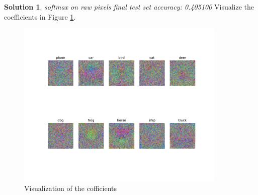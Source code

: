 \documentclass[]{book}
\theoremstyle{definition}
\newtheorem*{soln}{Solution}
\begin{document}
\begin{enumerate}
\begin{soln}
	\textsl{softmax on raw pixels final test set accuracy: 0.405100 }
	Visualize the coefficients in Figure \ref{fig:cofficient}.  
	\begin{figure}[H]
		\centering
		\includegraphics[width=10cm]{cofficients.pdf}
		\caption{Visualization of the cofficients}
		\label{fig:cofficient}
	\end{figure}

\end{soln}

\end{enumerate}
\end{document}
